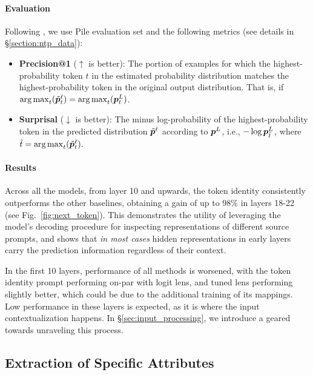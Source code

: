 \documentclass{article}
\theoremstyle{plain}
\theoremstyle{definition}
\theoremstyle{remark}
\begin{document}
\paragraph{Evaluation} 
Following \citet{din2023jump}, we use Pile evaluation set and the following metrics (see details in \S\ref{section:ntp_data}):
\begin{itemize}[itemsep=1pt, topsep=0pt,leftmargin=*]
    \item \textbf{Precision@1} ($\uparrow$ is better): The portion of examples for which the highest-probability token $t$ in the estimated probability distribution matches the highest-probability token in the original output distribution. That is, if $\operatorname*{arg\,max}_{t}(\tilde{{\bm{p}}}^\ell_t) = \operatorname*{arg\,max}_{t}({\bm{p}}^L_t)$.
    \item \textbf{Surprisal} ($\downarrow$ is better): The minus log-probability of the highest-probability token in the predicted distribution $\tilde{{\bm{p}}}^\ell$ according to ${\bm{p}}^L$, i.e., $-\log {\bm{p}}^L_{\tilde{t}}$, where $\tilde{t}=\operatorname*{arg\,max}_t(\tilde{{\bm{p}}}^\ell_t).$
\end{itemize} 

\paragraph{Results} Across all the models, from layer 10 and upwards, the token identity \methodName{} consistently outperforms the other baselines, obtaining a gain of up to 98\% in layers 18-22 (see Fig.~\ref{fig:next_token}). 
This demonstrates the utility of leveraging the model's decoding procedure for inspecting representations of different source prompts, and shows that \textit{in most cases} hidden representations in early layers carry the prediction information regardless of their context.

In the first 10 layers, performance of all methods is worsened, with the token identity prompt performing on-par with logit lens, and tuned lens performing slightly better, which could be due to the additional training of its mappings. Low performance in these layers is expected, as it is where the input contextualization happens. In \S\ref{sec:input_processing}, we introduce a \methodName{} geared towards unraveling this process.

\subsection{Extraction of Specific Attributes}
\label{sec:feature_extraction}
\end{document}
